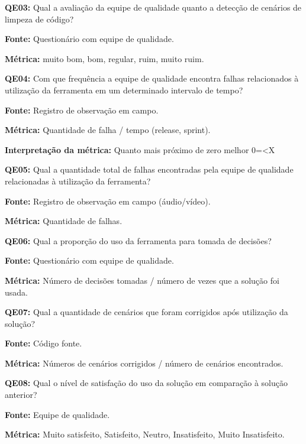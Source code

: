 
\textbf{QE03: } Qual a avaliação da equipe de qualidade quanto a detecção de cenários de limpeza de código?

\textbf{Fonte:} Questionário com equipe de qualidade.

\textbf{Métrica:} muito bom, bom, regular, ruim, muito ruim.


\textbf{QE04: } Com que frequência a equipe de qualidade encontra falhas relacionados à utilização da ferramenta em um determinado intervalo de tempo?

\textbf{Fonte:} Registro de observação em campo.

\textbf{Métrica:} Quantidade de falha / tempo (release, sprint).

\textbf{Interpretação da métrica:} Quanto mais próximo de zero melhor 0=<X


\textbf{QE05: } Qual a quantidade total de falhas encontradas pela equipe de qualidade relacionadas à utilização da ferramenta?

\textbf{Fonte:} Registro de observação em campo (áudio/vídeo).

\textbf{Métrica:} Quantidade de falhas.


\textbf{QE06: } Qual a proporção do uso da ferramenta para tomada de decisões?

\textbf{Fonte:} Questionário com equipe de qualidade.

\textbf{Métrica:} Número de decisões tomadas / número de vezes que a solução foi usada.



\textbf{QE07: } Qual a quantidade de cenários que foram corrigidos após utilização da solução?

\textbf{Fonte:} Código fonte.

\textbf{Métrica:} Números de cenários corrigidos / número de cenários encontrados.


\textbf{QE08: } Qual o nível de satisfação do uso da solução em comparação à solução anterior? 

\textbf{Fonte:} Equipe de qualidade.

\textbf{Métrica:} Muito satisfeito, Satisfeito, Neutro, Insatisfeito, Muito Insatisfeito.


